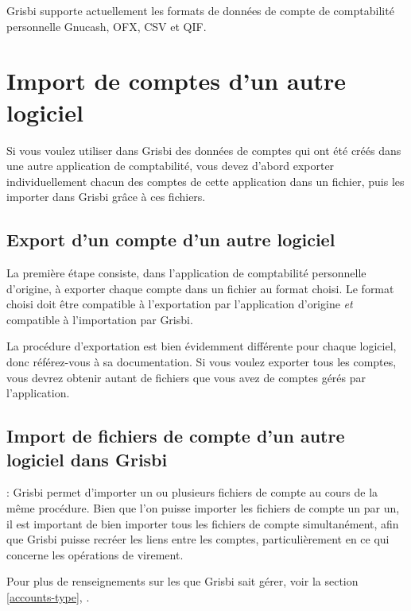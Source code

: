 Grisbi supporte actuellement les formats de données de compte de comptabilité personnelle \gls{Gnucash}, \gls{OFX}, \gls{CSV} et \gls{QIF}.


\section{Import de comptes d'un autre logiciel\label{importexport-import}}


Si vous voulez utiliser dans Grisbi des données de comptes qui ont été créés dans une autre application de comptabilité, vous devez d'abord exporter individuellement chacun des comptes de cette application dans un fichier, puis les importer dans Grisbi grâce à ces fichiers.


\subsection{Export d'un compte d'un autre logiciel\label{importexport-import-exportinit}}

La première étape consiste, dans l'application de comptabilité personnelle d'origine, à exporter chaque compte dans un fichier au format choisi. Le format choisi doit être compatible à l'exportation par l'application d'origine \emph{et} compatible à l'importation par Grisbi.

La procédure d'exportation est bien évidemment différente pour chaque logiciel, donc référez-vous à sa documentation. Si vous voulez exporter tous les comptes, vous devrez obtenir autant de fichiers que vous avez de comptes gérés par l'application.


\subsection{Import de fichiers de compte d'un autre logiciel dans Grisbi\label{importexport-import-importinit}}

\Note{}: Grisbi permet d'importer un ou plusieurs fichiers de compte au cours de la même procédure. Bien que l'on puisse importer les fichiers de compte un par un, il est important de bien importer tous les fichiers de compte simultanément, afin que Grisbi puisse recréer les liens entre les comptes, particulièrement en ce qui concerne les opérations de virement.

Pour plus de renseignements sur les  que Grisbi sait gérer, voir la section \vref{accounts-type}, .

